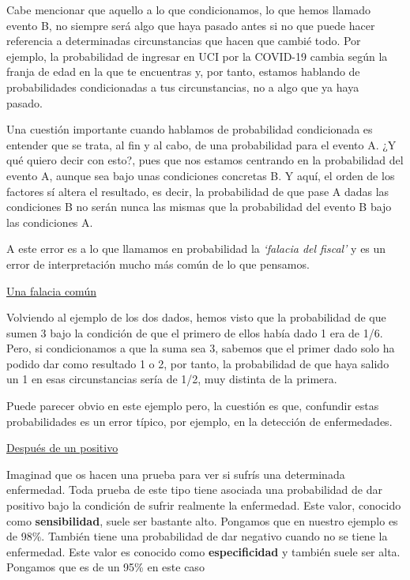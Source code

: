 \begin{myexampleblock}
\begin{small}
\vspace{2mm} Cabe mencionar que aquello a lo que condicionamos, lo que hemos llamado evento B, no siempre será algo que haya pasado antes si no que puede hacer referencia a determinadas circunstancias que hacen que cambié todo. Por ejemplo, la probabilidad de ingresar en UCI por la COVID-19 cambia según la franja de edad en la que te encuentras y, por tanto, estamos hablando de probabilidades condicionadas a tus circunstancias, no a algo que ya haya pasado.  

\vspace{2mm} Una cuestión importante cuando hablamos de probabilidad condicionada es entender que se trata, al fin y al cabo, de una probabilidad para el evento A. ¿Y qué quiero decir con esto?, pues que nos estamos centrando en la probabilidad del evento A, aunque sea bajo unas condiciones concretas B. Y aquí, el orden de los factores sí altera el resultado, es decir, la probabilidad de que pase A dadas las condiciones B no serán nunca las mismas que la probabilidad del evento B bajo las condiciones A.  

\vspace{2mm} A este error es a lo que llamamos en probabilidad la \emph{`falacia del fiscal’} y es un error de interpretación mucho más común de lo que pensamos. 

\vspace{2mm} \underline{Una falacia común}

\vspace{2mm} Volviendo al ejemplo de los dos dados, hemos visto que la probabilidad de que sumen 3 bajo la condición de que el primero de ellos había dado 1 era de 1/6. Pero, si condicionamos a que la suma sea 3, sabemos que el primer dado solo ha podido dar como resultado 1 o 2, por tanto, la probabilidad de que haya salido un 1 en esas circunstancias sería de 1/2, muy distinta de la primera.

\vspace{2mm} Puede parecer obvio en este ejemplo pero, la cuestión es que, confundir estas probabilidades es un error típico, por ejemplo, en la detección de enfermedades. 

\vspace{2mm} \underline{Después de un positivo}

\vspace{2mm} Imaginad que os hacen una prueba para ver si sufrís una determinada enfermedad. Toda prueba de este tipo tiene asociada una probabilidad de dar positivo bajo la condición de sufrir realmente la enfermedad. Este valor, conocido como \textbf{sensibilidad}, suele ser bastante alto. Pongamos que en nuestro ejemplo es de 98\%. También tiene una probabilidad de dar negativo cuando no se tiene la enfermedad. Este valor es conocido como \textbf{especificidad} y también suele ser alta. Pongamos que es de un 95\% en este caso


\end{small}
\end{myexampleblock}
